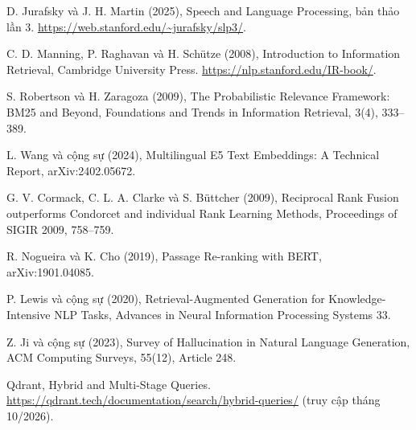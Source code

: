 
{\noindent [1] D. Jurafsky và J. H. Martin (2025), Speech and Language Processing, bản thảo lần 3. \url{https://web.stanford.edu/~jurafsky/slp3/}.\par}\vspace{6pt}

{\noindent [2] C. D. Manning, P. Raghavan và H. Schütze (2008), Introduction to Information Retrieval, Cambridge University Press. \url{https://nlp.stanford.edu/IR-book/}.\par}\vspace{6pt}

{\noindent [3] S. Robertson và H. Zaragoza (2009), The Probabilistic Relevance Framework: BM25 and Beyond, Foundations and Trends in Information Retrieval, 3(4), 333--389.\par}\vspace{6pt}

{\raggedright\noindent [4] L. Wang và cộng sự (2024), Multilingual E5 Text Embeddings: A Technical Report, arXiv:2402.05672.\par}\vspace{6pt}

{\noindent [5] G. V. Cormack, C. L. A. Clarke và S. Büttcher (2009), Reciprocal Rank Fusion outperforms Condorcet and individual Rank Learning Methods, Proceedings of SIGIR 2009, 758--759.\par}\vspace{6pt}

{\noindent [6] R. Nogueira và K. Cho (2019), Passage Re-ranking with BERT, arXiv:1901.04085.\par}\vspace{6pt}

{\noindent [7] P. Lewis và cộng sự (2020), Retrieval-Augmented Generation for Knowledge-Intensive NLP Tasks, Advances in Neural Information Processing Systems 33.\par}\vspace{6pt}

{\noindent [8] Z. Ji và cộng sự (2023), Survey of Hallucination in Natural Language Generation, ACM Computing Surveys, 55(12), Article 248.\par}\vspace{6pt}

{\noindent [9] Qdrant, Hybrid and Multi-Stage Queries. \url{https://qdrant.tech/documentation/search/hybrid-queries/} (truy cập tháng 10/2026).\par}\vspace{6pt}

